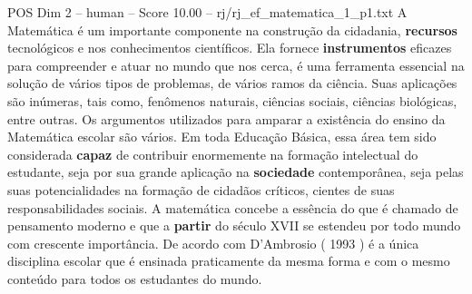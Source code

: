 \begin{textsample}{POS Dim 2 – human – Score 10.00 – rj/rj\_ef\_matematica\_1\_p1.txt}  \label{ex:f2_pos_002}
A Matemática é um importante componente na construção da cidadania, \textbf{recursos} tecnológicos e nos conhecimentos científicos.
Ela fornece \textbf{instrumentos} eficazes para compreender e atuar no mundo que nos cerca, é uma ferramenta essencial na solução de vários tipos de problemas, de vários ramos da ciência.
Suas aplicações são inúmeras, tais como, fenômenos naturais, ciências sociais, ciências biológicas, entre outras.
Os argumentos utilizados para amparar a existência do ensino da Matemática escolar são vários.
Em toda Educação Básica, essa área tem sido considerada \textbf{capaz} de contribuir enormemente na formação intelectual do estudante, seja por sua grande aplicação na \textbf{sociedade} contemporânea, seja pelas suas potencialidades na formação de cidadãos críticos, cientes de suas responsabilidades sociais.
A matemática concebe a essência do que é chamado de pensamento moderno e que a \textbf{partir} do século XVII se estendeu por todo mundo com crescente importância.
De acordo com D’Ambrosio ( 1993 ) é a única disciplina escolar que é ensinada praticamente da mesma forma e com o mesmo conteúdo para todos os estudantes do mundo.

\end{textsample}
